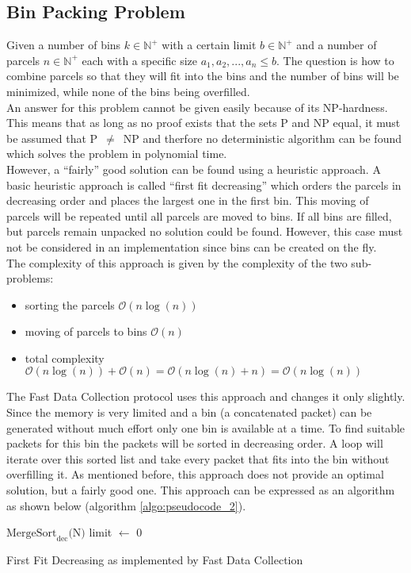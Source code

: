 \subsection{Bin Packing Problem}
\label{sec:bin_backing_problem}
Given a number of bins $k\in\mathbb{N}^+$ with a certain limit $b\in\mathbb{N}^+$ and a number of parcels $n\in\mathbb{N}^+$ each with a specific size $a_1,a_2,...,a_n\leq b$. The question is how to combine parcels so that they will fit into the bins and the number of bins will be minimized, while none of the bins being overfilled.\\
An answer for this problem cannot be given easily because of its NP-hardness. This means that as long as no proof exists that the sets P and NP equal, it must be assumed that \mbox{P $\neq$ NP} and therfore no deterministic algorithm can be found which solves the problem in polynomial time.\\
However, a ``fairly'' good solution can be found using a heuristic approach. A basic heuristic approach is called ``first fit decreasing'' which orders the parcels in decreasing order and places the largest one in the first bin. This moving of parcels will be repeated until all parcels are moved to bins. If all bins are filled, but parcels remain unpacked no solution could be found. However, this case must not be considered in an implementation since bins can be created on the fly.\\
The complexity of this approach is given by the complexity of the two sub-problems:
\begin{itemize}
\item sorting the parcels $\mathcal{O}(n \log(n))$
\item moving of parcels to bins $\mathcal{O}(n)$
\item total complexity $\mathcal{O}(n \log(n)) + \mathcal{O}(n) = \mathcal{O}(n \log(n) + n) = \mathcal{O}(n \log(n))$
\end{itemize}
The Fast Data Collection protocol uses this approach and changes it only slightly. Since the memory is very limited and a bin (a concatenated packet) can be generated without much effort only one bin is available at a time. To find suitable packets for this bin the packets will be sorted in decreasing order. A loop will iterate over this sorted list and take every packet that fits into the bin without overfilling it. As mentioned before, this  approach does not provide an optimal solution, but a fairly good one. This approach can be expressed as an algorithm as shown below (algorithm \ref{algo:pseudocode_2}).
\begin{algorithm}
	$\text{MergeSort}_{\text{dec}}\text{(N)}$\;
	limit $\leftarrow$ 0\;
	\caption{First Fit Decreasing as implemented by Fast Data Collection}
	\label{algo:pseudocode_2}
\end{algorithm}

